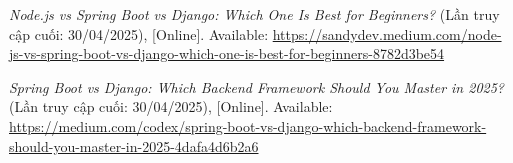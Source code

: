 \documentclass[12pt, a4paper]{article}
\begin{document}
\begin{thebibliography}{}
	 \textit{Node.js vs Spring Boot vs Django: Which One Is Best for Beginners?} (Lần truy cập cuối: 30/04/2025), [Online]. Available: \url{https://sandydev.medium.com/node-js-vs-spring-boot-vs-django-which-one-is-best-for-beginners-8782d3be54}

	 \textit{Spring Boot vs Django: Which Backend Framework Should You Master in 2025?} (Lần truy cập cuối: 30/04/2025), [Online]. Available: \url{https://medium.com/codex/spring-boot-vs-django-which-backend-framework-should-you-master-in-2025-4dafa4d6b2a6}
\end{thebibliography}

% 
\end{document}
